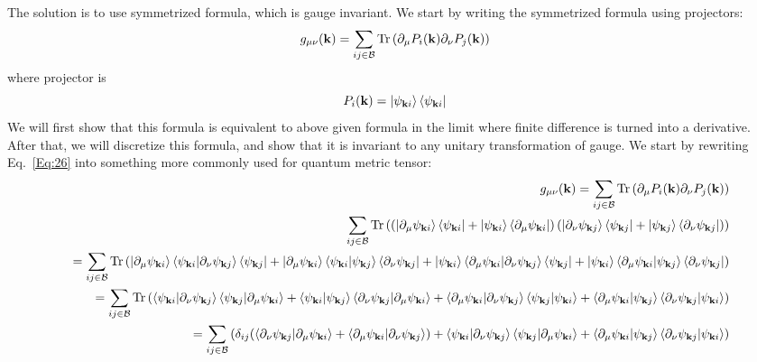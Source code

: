 \documentclass[onecolumn, prb,preprintnumbers,amsmath,amssymb,floatfix]{revtex4}
\newcommand{\vk}{{\mathbf{k}}}
\newcommand{\Tr}{\mathrm{Tr}} \newcommand{\npsi}{\underline{\psi}}
\newcommand{\cb}{{\cal B}}
\begin{document}
The solution is to use symmetrized formula, which is gauge invariant.
We start by writing the symmetrized formula using projectors:
\begin{eqnarray}
g_{\mu\nu}(\vk)  =  \sum_{i j \in\cb}\Tr\left(\partial_\mu P_i(\vk) \partial_\nu P_j(\vk) \right)
\label{Eq:26}
\end{eqnarray}  
where projector is
$$P_i(\vk) =\ket{\psi_{\vk i}}\bra{\psi_{\vk i}}$$
We will first show that this formula is equivalent to above given
formula in the limit where finite difference is turned into a
derivative. After that, we will discretize this formula, and show that
it is invariant to any unitary transformation of gauge.
We start by rewriting Eq.~\ref{Eq:26} into something more commonly
used for quantum metric tensor:
\begin{eqnarray}
&&  g_{\mu\nu}(\vk)  =  \sum_{i j \in\cb}\Tr\left(\partial_\mu P_i(\vk) \partial_\nu P_j(\vk) \right)
\nonumber\\
&&   \sum_{i j \in\cb}\Tr\left(
  \left(\ket{\partial_\mu \psi_{\vk i}}\bra{\psi_{\vk i}}+\ket{\psi_{\vk i}}\bra{\partial_\mu \psi_{\vk i}}\right)
  \left(\ket{\partial_\nu \psi_{\vk j}}\bra{\psi_{\vk j}} +\ket{\psi_{\vk j}}\bra{\partial_\nu\psi_{\vk j}}\right)
   \right)
 \label{Eq:projectorProof}\\
 && =
\sum_{ij\in\cb}\Tr\left(
  \ket{\partial_\mu \psi_{\vk i}}\braket{\psi_{\vk i} |\partial_\nu \psi_{\vk j}}\bra{\psi_{\vk j}} 
  +\ket{\partial_\mu \psi_{\vk i}}\braket{\psi_{\vk i}|\psi_{\vk j}}\bra{\partial_\nu\psi_{\vk j}}
  +\ket{\psi_{\vk i}}\braket{\partial_\mu \psi_{\vk i}|\partial_\nu \psi_{\vk j}}\bra{\psi_{\vk j}}
  +\ket{\psi_{\vk i}}\braket{\partial_\mu \psi_{\vk i}|\psi_{\vk j}}\bra{\partial_\nu\psi_{\vk j}}
  \right)
    \nonumber\\
  &&=
\sum_{ij\in\cb}\Tr\left(
  \braket{\psi_{\vk i} |\partial_\nu \psi_{\vk j}}\braket{\psi_{\vk j}|\partial_\mu \psi_{\vk i}}
  +\braket{\psi_{\vk i}|\psi_{\vk j}}\braket{\partial_\nu\psi_{\vk j}|\partial_\mu \psi_{\vk i}}
  +\braket{\partial_\mu \psi_{\vk i}|\partial_\nu \psi_{\vk j}}\braket{\psi_{\vk j}|\psi_{\vk i}}
  +\braket{\partial_\mu \psi_{\vk i}|\psi_{\vk j}}\braket{\partial_\nu\psi_{\vk j}|\psi_{\vk i}}
     \right)\nonumber\\
  &&=\sum_{ij\in\cb}\left(
    \delta_{ij} (\braket{\partial_\nu\psi_{\vk j}|\partial_\mu \psi_{\vk i}}+\braket{\partial_\mu \psi_{\vk i}|\partial_\nu \psi_{\vk j}})
  + \braket{\psi_{\vk i} |\partial_\nu \psi_{\vk j}}\braket{\psi_{\vk j}|\partial_\mu \psi_{\vk i}}
  + \braket{\partial_\mu \psi_{\vk i}|\psi_{\vk j}}\braket{\partial_\nu\psi_{\vk j}|\psi_{\vk i}}
     \right)\nonumber
 \end{eqnarray}
\end{document}
